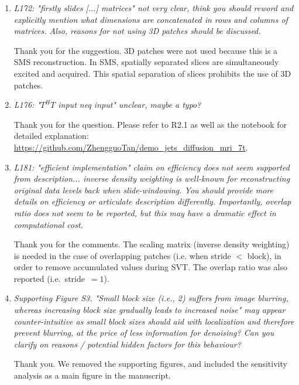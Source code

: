 \documentclass[a4paper,11pt,twoside]{report}
\begin{document}
\begin{enumerate}[resume]
    \item \textit{L172: "firstly slides [...] matrices" \textrightarrow not very clear, think you should reword and explicitly mention what dimensions are concatenated in rows and columns of matrices. Also, reasons for not using 3D patches should be discussed.}

    \hspace{1em} Thank you for the suggestion.
    3D patches were not used because this is a SMS reconstruction.
    In SMS, spatially separated slices
    are simultaneously excited and acquired.
    This spatial separation of slices prohibits the use of 3D patches.

    \item \textit{L176: "$T^HT$ input neq input" \textrightarrow unclear, maybe a typo?}

    \hspace{1em} Thank you for the question.
    Please refer to R2.1 as well as the notebook for detailed explanation:
    \url{https://github.com/ZhengguoTan/demo_jets_diffusion_mri_7t}.

    \item \textit{L181: "efficient implementation" \textrightarrow claim on efficiency does not seem supported from description... inverse density weighting is well-known for reconstructing original data levels back when slide-windowing. You should provide more details on efficiency or articulate description differently. Importantly, overlap ratio does not seem to be reported, but this may have a dramatic effect in computational cost.}

    \hspace{1em} Thank you for the comments.
    The scaling matrix (inverse density weighting) is needed
    in the case of overlapping patches (i.e. when stride $<$ block),
    in order to remove accumulated values during SVT.
    The overlap ratio was also reported (i.e.~stride~$=1$).

    \item \textit{Supporting Figure S3. "Small block size (i.e., 2) suffers from image blurring, whereas increasing block size gradually leads to increased noise" \textrightarrow may appear counter-intuitive as small block sizes should aid with localization and therefore prevent blurring, at the price of less information for denoising? Can you clarify on reasons / potential hidden factors for this behaviour?}

    \hspace{1em} Thank you. We removed the supporting figures,
    and included the sensitivity analysis as a main figure
    in the manuscript.


\end{enumerate}
\end{document}
